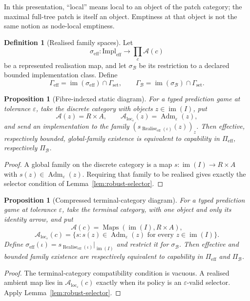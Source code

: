 \documentclass[11pt]{article}
\theoremstyle{plain}
\newtheorem{proposition}[theorem]{Proposition}
\theoremstyle{definition}
\newtheorem{definition}[theorem]{Definition}
\theoremstyle{remark}
\newcommand{\im}{\operatorname{im}}
\newcommand{\Adm}{\operatorname{Adm}}
\newcommand{\realise}{\operatorname{Realise}}
\newcommand{\LocalAdm}{\mathcal{A}_{\mathrm{loc}}}
\newcommand{\eps}{\varepsilon}
\begin{document}
In this presentation, ``local'' means local to an object of the patch category;
the maximal full-tree patch is itself an object. Emptiness at that object is not
the same notion as node-local emptiness.

\begin{definition}[Realised family spaces]\label{def:ECD}
Let
\[
\sigma_{\mathrm{eff}}:\mathrm{Impl}_{\mathrm{eff}}
\to\prod_c\mathcal A(c)
\]
be a represented realisation map, and let $\sigma_{\mathcal B}$ be its
restriction to a declared bounded implementation class. Define
\[
\Gamma_{\mathrm{eff}}
=\im(\sigma_{\mathrm{eff}})\cap\Gamma_{\mathrm{set}},
\qquad
\Gamma_{\mathcal B}
=\im(\sigma_{\mathcal B})\cap\Gamma_{\mathrm{set}}.
\]
\end{definition}



\begin{proposition}[Fibre-indexed static diagram]\label{prop:fibre-diagram}
For a typed prediction game at tolerance $\eps$, take the discrete category with
objects $z\in\im(I)$, put
\[
\mathcal A(z)=R\times A,
\qquad
\LocalAdm_\eps(z)=\Adm_\eps(z),
\]
and send an implementation to the family
$(s_{\realise_{\mathrm{eff}}(\iota)}(z))_z$. Then effective, respectively
bounded, global-family existence is equivalent to capability in
$\Pi_{\mathrm{eff}}$, respectively $\Pi_{\mathcal B}$.
\end{proposition}

\begin{proof}
A global family on the discrete category is a map
$s:\im(I)\to R\times A$ with $s(z)\in\Adm_\eps(z)$. Requiring that family to be
realised gives exactly the selector condition of
Lemma~\ref{lem:robust-selector}.
\end{proof}

\begin{proposition}[Compressed terminal-category diagram]\label{prop:reduction}
For a typed prediction game at tolerance $\eps$, take the terminal category, with one object and only its identity arrow, and
put
\[
\mathcal A(c)=\operatorname{Maps}(\im(I),R\times A),
\]
\[
\LocalAdm_\eps(c)=
\{s:s(z)\in\Adm_\eps(z)\text{ for every }z\in\im(I)\}.
\]
Define
$\sigma_{\mathrm{eff}}(\iota)=
s_{\realise_{\mathrm{eff}}(\iota)}|_{\im(I)}$ and restrict it for
$\sigma_{\mathcal B}$. Then effective and bounded family existence are
respectively equivalent to capability in $\Pi_{\mathrm{eff}}$ and
$\Pi_{\mathcal B}$.
\end{proposition}

\begin{proof}
The terminal-category compatibility condition is vacuous. A realised ambient map lies
in $\LocalAdm_\eps(c)$ exactly when its policy is an $\eps$-valid selector.
Apply Lemma~\ref{lem:robust-selector}.
\end{proof}
\end{document}

